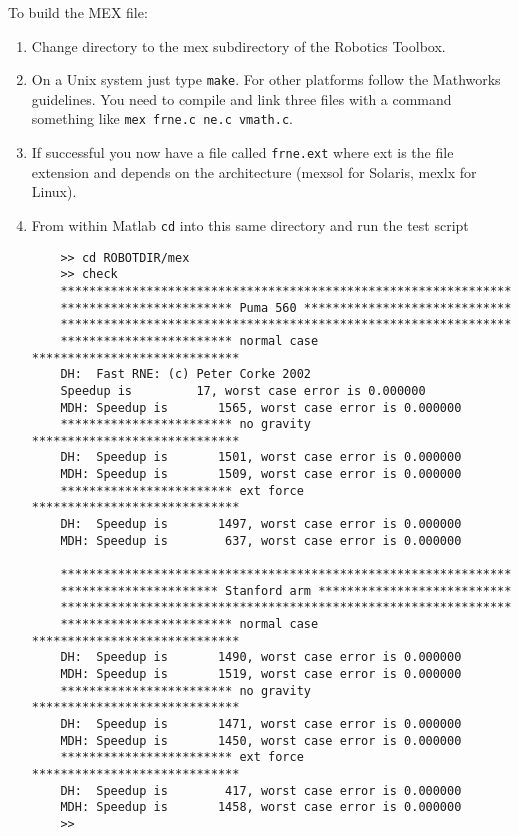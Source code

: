 \documentclass{article}
\newcommand{\var}[1]{{\vtt #1}}
\begin{document}
To build the MEX file:
\begin{enumerate}
\item Change directory to the \var{mex} subdirectory of the Robotics Toolbox.
\item On a Unix system just type \texttt{make}.  For other platforms
follow the Mathworks guidelines.  You need to compile and link three files
with a command something like \texttt{mex frne.c ne.c vmath.c}.

\item If successful you now have a file called \texttt{frne.ext} where 
\var{ext} is the file extension and depends on the architecture
(\var{mexsol} for Solaris, \var{mexlx} for Linux).

\item From within Matlab \texttt{cd} into this same directory and run the 
test script
{\small
\begin{verbatim}
    >> cd ROBOTDIR/mex
    >> check
    ***************************************************************
    ************************ Puma 560 *****************************
    ***************************************************************
    ************************ normal case *****************************
    DH:  Fast RNE: (c) Peter Corke 2002
    Speedup is         17, worst case error is 0.000000
    MDH: Speedup is       1565, worst case error is 0.000000
    ************************ no gravity *****************************
    DH:  Speedup is       1501, worst case error is 0.000000
    MDH: Speedup is       1509, worst case error is 0.000000
    ************************ ext force *****************************
    DH:  Speedup is       1497, worst case error is 0.000000
    MDH: Speedup is        637, worst case error is 0.000000
    
    ***************************************************************
    ********************** Stanford arm ***************************
    ***************************************************************
    ************************ normal case *****************************
    DH:  Speedup is       1490, worst case error is 0.000000
    MDH: Speedup is       1519, worst case error is 0.000000
    ************************ no gravity *****************************
    DH:  Speedup is       1471, worst case error is 0.000000
    MDH: Speedup is       1450, worst case error is 0.000000
    ************************ ext force *****************************
    DH:  Speedup is        417, worst case error is 0.000000
    MDH: Speedup is       1458, worst case error is 0.000000
    >> 
\end{verbatim}
}


\end{enumerate}
\end{document}
